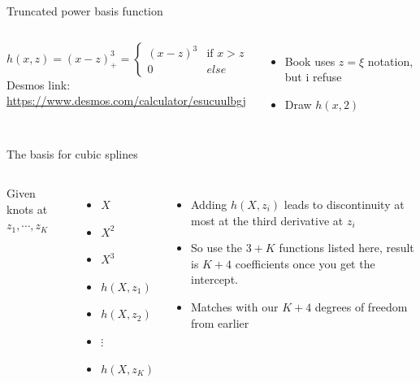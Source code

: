 \documentclass[aspectratio=169,usenames,dvipsnames]{beamer}
\newcommand{\InstructorList}[1]{
\begin{itemize}
	\color{orange}
	#1
\end{itemize}
}
\begin{document}
\begin{frame}[t]{Truncated power basis function}

\begin{columns}
\centering

\begin{equation*}
h(x,z) = (x-z)^3_+ =
\begin{cases}
	(x-z)^3 & \text{if } x>z \\
	0 & else
\end{cases}
\end{equation*}
Desmos link:
\url{https://www.desmos.com/calculator/esucuulbgj}
\centering
\InstructorList{
  \item Book uses $z=\xi$ notation, but i refuse
	\item Draw $h(x,2)$
}

\end{columns}

\end{frame}
\begin{frame}[t]{The basis for cubic splines }

\begin{columns}
\centering
Given knots at $z_1,\cdots,z_K$
\begin{itemize}
	\item $X$
	\item $X^2$
	\item $X^3$
	\item $h(X,z_1)$
	\item $h(X,z_2)$
	\item $\vdots$
	\item $h(X,z_K)$
\end{itemize}
\centering


\InstructorList{
  \item Adding $h(X,z_i)$ leads to discontinuity at most at the third derivative at $z_i$
	\item So use the $3+K$ functions listed here, result is $K+4$ coefficients once you get the intercept.
	\item Matches with our $K+4$ degrees of freedom from earlier
}

\end{columns}

\end{frame}
\end{document}
